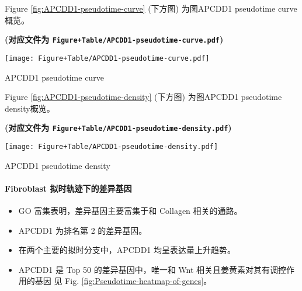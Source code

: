 \documentclass[
]{article}
\newenvironment{Shaded}{\begin{snugshade}}{\end{snugshade}}
\newcommand{\DecValTok}[1]{\textcolor[rgb]{0.00,0.00,0.81}{#1}}
\newcommand{\FloatTok}[1]{\textcolor[rgb]{0.00,0.00,0.81}{#1}}
\newcommand{\KeywordTok}[1]{\textcolor[rgb]{0.13,0.29,0.53}{\textbf{#1}}}
\newcommand{\NormalTok}[1]{#1}
\newcommand{\OperatorTok}[1]{\textcolor[rgb]{0.81,0.36,0.00}{\textbf{#1}}}
\newcommand{\StringTok}[1]{\textcolor[rgb]{0.31,0.60,0.02}{#1}}
\providecommand{\tightlist}{%
  \setlength{\itemsep}{0pt}\setlength{\parskip}{0pt}}
\begin{document}
Figure \ref{fig:APCDD1-pseudotime-curve} (下方图) 为图APCDD1 pseudotime curve概览。

\textbf{(对应文件为 \texttt{Figure+Table/APCDD1-pseudotime-curve.pdf})}

\def\@captype{figure}
\begin{center}
\texttt{[image: Figure+Table/APCDD1-pseudotime-curve.pdf]}
\caption{APCDD1 pseudotime curve}\label{fig:APCDD1-pseudotime-curve}
\end{center}

Figure \ref{fig:APCDD1-pseudotime-density} (下方图) 为图APCDD1 pseudotime density概览。

\textbf{(对应文件为 \texttt{Figure+Table/APCDD1-pseudotime-density.pdf})}

\def\@captype{figure}
\begin{center}
\texttt{[image: Figure+Table/APCDD1-pseudotime-density.pdf]}
\caption{APCDD1 pseudotime density}\label{fig:APCDD1-pseudotime-density}
\end{center}

\hypertarget{fibroblast-ux62dfux65f6ux8f68ux8ff9ux4e0bux7684ux5deeux5f02ux57faux56e0}{%
\paragraph{Fibroblast 拟时轨迹下的差异基因}\label{fibroblast-ux62dfux65f6ux8f68ux8ff9ux4e0bux7684ux5deeux5f02ux57faux56e0}}

\begin{itemize}
\tightlist
\item
  GO 富集表明，差异基因主要富集于和 Collagen 相关的通路。
\item
  APCDD1 为排名第 2 的差异基因。
\item
  在两个主要的拟时分支中，APCDD1 均呈表达量上升趋势。
\item
  APCDD1 是 Top 50 的差异基因中，唯一和 Wnt 相关且姜黄素对其有调控作用的基因
  见 Fig. \ref{fig:Pseudotime-heatmap-of-genes}。
\end{itemize}

\begin{Shaded}
\end{Shaded}
\end{document}
